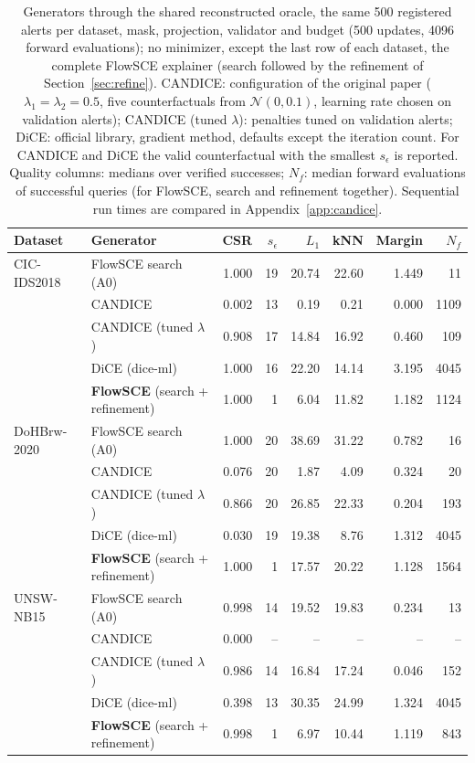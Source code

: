 \begin{table}[t]
\centering\small
\caption{Generators through the shared reconstructed oracle, the same 500 registered alerts per dataset, mask, projection, validator and budget (500 updates, 4096 forward evaluations); no minimizer, except the last row of each dataset, the complete FlowSCE explainer (search followed by the refinement of Section~\ref{sec:refine}). CANDICE: configuration of the original paper ($\lambda_1=\lambda_2=0.5$, five counterfactuals from $\mathcal N(0,0.1)$, learning rate chosen on validation alerts); CANDICE (tuned $\lambda$): penalties tuned on validation alerts; DiCE: official library, gradient method, defaults except the iteration count. For CANDICE and DiCE the valid counterfactual with the smallest $s_\epsilon$ is reported. Quality columns: medians over verified successes; $N_f$: median forward evaluations of successful queries (for FlowSCE, search and refinement together). Sequential run times are compared in Appendix~\ref{app:candice}.}
\label{tab:generators}
\begin{tabular}{@{}llrrrrrr@{}}
\toprule
Dataset & Generator & CSR & $s_\epsilon$ & $L_1$ & kNN & Margin & $N_f$ \\
\midrule
CIC-IDS2018 & FlowSCE search (A0) & 1.000 & 19 & 20.74 & 22.60 & 1.449 & 11 \\
 & CANDICE & 0.002 & 13 & 0.19 & 0.21 & 0.000 & 1109 \\
 & CANDICE (tuned $\lambda$) & 0.908 & 17 & 14.84 & 16.92 & 0.460 & 109 \\
 & DiCE (dice-ml) & 1.000 & 16 & 22.20 & 14.14 & 3.195 & 4045 \\
 & \textbf{FlowSCE} (search + refinement) & 1.000 & 1 & 6.04 & 11.82 & 1.182 & 1124 \\
\midrule
DoHBrw-2020 & FlowSCE search (A0) & 1.000 & 20 & 38.69 & 31.22 & 0.782 & 16 \\
 & CANDICE & 0.076 & 20 & 1.87 & 4.09 & 0.324 & 20 \\
 & CANDICE (tuned $\lambda$) & 0.866 & 20 & 26.85 & 22.33 & 0.204 & 193 \\
 & DiCE (dice-ml) & 0.030 & 19 & 19.38 & 8.76 & 1.312 & 4045 \\
 & \textbf{FlowSCE} (search + refinement) & 1.000 & 1 & 17.57 & 20.22 & 1.128 & 1564 \\
\midrule
UNSW-NB15 & FlowSCE search (A0) & 0.998 & 14 & 19.52 & 19.83 & 0.234 & 13 \\
 & CANDICE & 0.000 & -- & -- & -- & -- & -- \\
 & CANDICE (tuned $\lambda$) & 0.986 & 14 & 16.84 & 17.24 & 0.046 & 152 \\
 & DiCE (dice-ml) & 0.398 & 13 & 30.35 & 24.99 & 1.324 & 4045 \\
 & \textbf{FlowSCE} (search + refinement) & 0.998 & 1 & 6.97 & 10.44 & 1.119 & 843 \\
\bottomrule
\end{tabular}
\end{table}

